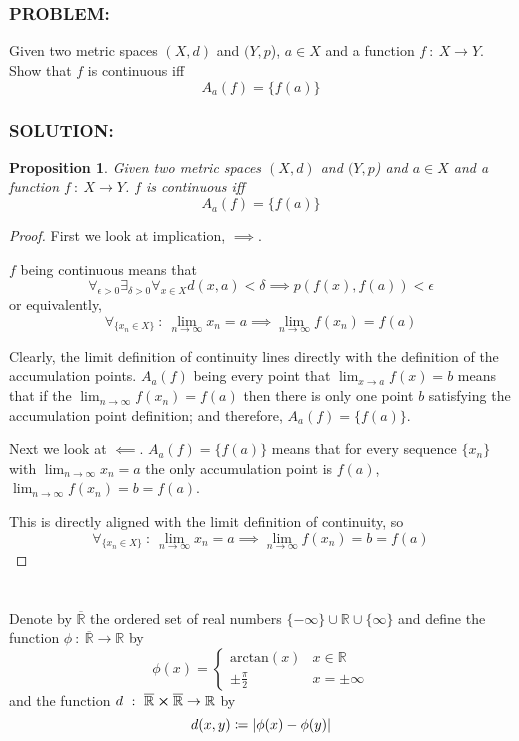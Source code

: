 \documentclass[]{article}
\newcommand{\Problem}{\subsubsection*{\textbf{PROBLEM:}}}
\newcommand{\Solution}{\subsubsection*{\textbf{SOLUTION:}}}
\newcommand{\R}{\mathbb{R}}
\newcommand{\st}{\ : \ }
\newtheorem{proposition}{Proposition}
\begin{document}
\section{}
\Problem
Given two metric spaces $(X,d)$ and $(Y,p$), $a \in X$ and a function $f \st X \to Y$.
Show that $f$ is continuous iff \[
    A_a(f) = \{f(a)\}
\]
\Solution
\begin{proposition}
    Given two metric spaces $(X,d)$ and $(Y,p$) and  $a \in X$ and a function $f \st X \to Y$.
    $f$ is continuous iff \[
        A_a(f) = \{f(a)\}
    \]
\end{proposition}
\begin{proof}
    First we look at implication, $\implies$.

    $f$ being continuous means that \[
        \forall_{\epsilon > 0} \exists_{\delta > 0} \forall_{x \in X} d(x,a) < \delta \implies p(f(x), f(a)) < \epsilon
    \] or equivalently,\[
        \forall_{\{x_n \in X\}} \st \lim_{n \to \infty} x_n = a \implies \lim_{n \to \infty} f(x_n) = f(a)
    \]

    Clearly, the limit definition of continuity lines directly with the definition of the accumulation points.
    $A_a(f)$ being every point that $\lim_{x \to a} f(x) = b$ means that if the $\lim_{n \to \infty} f(x_n) = f(a)$ then there is only one point $b$ satisfying the accumulation point definition; and therefore, $A_a(f) = \{f(a)\}$.

    Next we look at $\impliedby$.
    $A_a(f) = \{f(a)\}$ means that for every sequence $\{x_n\}$ with $\lim_{n \to \infty} x_n = a$ the only accumulation point is $f(a)$, $\lim_{n \to \infty} f(x_n) = b = f(a)$.

    This is directly aligned with the limit definition of continuity, so \[
        \forall_{\{x_n \in X\}} \st \lim_{n \to \infty} x_n = a \implies \lim_{n \to \infty} f(x_n) = b = f(a)
    \]
\end{proof}



\newpage
\section{}
Denote by $\overline{\mathbb{R}}$ the ordered set of real numbers $\{-\infty\} \cup \R \cup \{\infty\}$ and define the function $\phi \st \overline{\mathbb{R}} \to \R$ by \[
    \phi(x) = \begin{cases}
        \text{arctan}(x) & x \in \R\\
        \pm \frac{\pi}{2} & x = \pm \infty
    \end{cases}
\] and the function $d \st \overline{\R} \cross \overline{\R} \to \R$ by \[
    d(x,y) \coloneqq \abs{\phi(x) - \phi(y)}
\]
\end{document}
